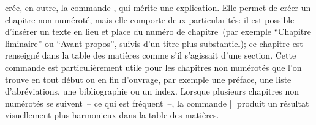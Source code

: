\frenchlaw crée, en outre, la commande , qui mérite une explication. Elle permet de créer un chapitre non numéroté, mais elle comporte deux particularités:  il est possible d'insérer un texte en lieu et place du numéro de chapitre~(par exemple \enquote{Chapitre liminaire} ou \enquote{Avant-propos}, suivis d'un titre plus substantiel);  ce chapitre est renseigné dans la table des matières comme s'il s'agissait d'une section. Cette commande est particulièrement utile pour les chapitres non numérotés que l'on trouve en tout début ou en fin d'ouvrage, par exemple une préface, une liste d'abréviations, une bibliographie ou un index. Lorsque plusieurs chapitres non numérotés se suivent~-- ce qui est fréquent~--, la commande |\fakechapter| produit un résultat visuellement plus harmonieux dans la table des matières.

\begin{noprint}
\newcommand{\fakechapter}[2][]{%
	\clearforchapter
	\thispagestyle{chapter}
	\@schapter{\if\relax#1\relax\else\if@modern\MakeLowercase{#1}\else#1\fi\afterchapternum\fi#2}
	\chaptermark{#1}
	\phantomsection
	\addcontentsline{toc}{section}{\if\relax#1\relax\else#1\cftchapteraftersnum\cftchapteraftersnumb~\fi#2}}
\end{noprint}

\begin{macro}
\end{macro}


